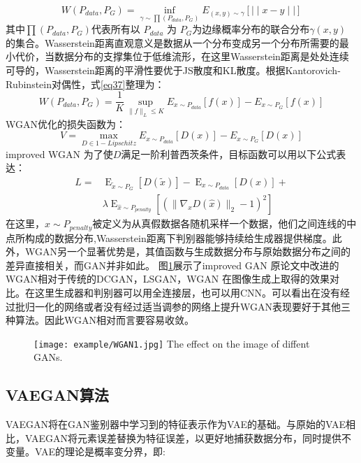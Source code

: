 \begin{equation}
\label{eq37}
W(P_{data},P_{G})= \inf \limits_{\gamma \sim \prod (P_{data},P_{G})} E_{(x,y)\sim\gamma}[\mid\mid x-y\mid\mid]
\end{equation}
其中${ \prod (P_{data},P_{G})}$代表所有以 $P_{data}$ 为 $P_{G}$为边缘概率分布的联合分布$\gamma(x,y)$ 的集合。Wasserstein距离直观意义是数据从一个分布变成另一个分布所需要的最小代价，当数据分布的支撑集位于低维流形，在这里Wasserstein距离是处处连续可导的，Wasserstein距离的平滑性要优于JS散度和KL散度。根据Kantorovich-Rubinstein对偶性，式\ref{eq37}整理为：
\begin{equation}
\label{eq38}
W(P_{data},P_{G})= \frac{1}{K} \sup \limits_{\| f \| _{L} \leq K} E_{x\sim P_{data}}[f(x)]-E_{x\sim P_{G}}[f(x)]
\end{equation}
WGAN优化的损失函数为：
\begin{equation}
\label{eq39}
V= \max \limits_{D\in 1- Lipschitz} E_{x\sim P_{data}}[D(x)]-E_{x\sim P_{G}}[D(x)]
\end{equation}
improved WGAN 为了使$D$满足一阶利普西茨条件，目标函数可以用以下公式表达：
\begin{equation}
\label{eq10}
\begin{aligned}
L=&\mathop{E}_{\tilde{x} \sim P_{G}}[D( \tilde{x})]- \mathop{E}_{x \sim P_{data}}[D(x)]+ \\&\lambda \mathop{E}_{\hat{x}\sim P_{ {penalty}}} [(\| \nabla _{  \hat{x}} D(\hat{x}) \|_{2} - 1)^{2}]
\end{aligned}
\end{equation}
在这里，$\hat{x}\sim P_{ {penalty}}$被定义为从真假数据各随机采样一个数据，他们之间连线的中点所构成的数据分布,Wasserstein距离下判别器能够持续给生成器提供梯度。此外，WGAN另一个显著优势是，其值函数与生成数据分布与原始数据分布之间的差异直接相关，而GAN并非如此。
图\ref{fig:GAN1}展示了improved GAN 原论文中改进的WGAN相对于传统的DCGAN，LSGAN，WGAN 在图像生成上取得的效果对比。在这里生成器和判别器可以用全连接层，也可以用CNN。可以看出在没有经过批归一化的网络或者没有经过适当调参的网络上提升WGAN表现要好于其他三种算法。因此WGAN相对而言要容易收敛。
\begin{figure}[htbp]
	\centering
	\texttt{[image: example/WGAN1.jpg]}
	\hspace{1cm}
	{The effect on the image of diffent GANs.}
	\label{fig:GAN1}
\end{figure}

\subsection{VAEGAN算法}
VAEGAN将在GAN鉴别器中学习到的特征表示作为VAE的基础。与原始的VAE相比，VAEGAN将元素误差替换为特征误差，以更好地捕获数据分布，同时提供不变量\cite{7}。VAE的理论是概率变分界\cite{16}，即:

